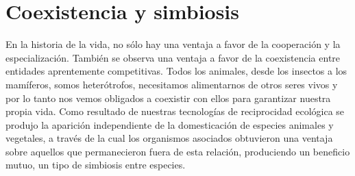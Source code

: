 \documentclass[a4paper,10pt]{book}
\theoremstyle{definition}
\newif\ifen
\newif\ifes
\newcommand{\en}[1]{\ifen#1\fi}
\newcommand{\es}[1]{\ifes#1\fi}
\newcommand{\Ee}{\en{s}\es{e}}
\begin{document}
\es{Cuando el grupo tiene tama\~no 1, la estrategia \'optima es $\Ee^*=p$. }%
\es{Pero apenas surge la cooperaci\'on aparece una ventaja a favor de las estrategias especialistas $\Ee^* > p = 0.71$. }%
%
\es{Cuanto m\'as grande son los grupos, m\'as especialista es vuelve la estrategia \'optima. }%
%
\en{At the extremes (cooperative groups of infinite size) the optimal strategy is reached at the maximum level of specialization, $\Ee=1$. }%
\es{En el extremos (grupos cooperativos de tama\~no inifinito) la estrategia \'optima se alcanza con el nivel de especializaci\'on m\'aximo, $\Ee=1$. }%
%
\es{Aqu\'i mostramos que, una vez que la cooperaci\'on emerge, las estrategias individualmente mal adaptadas al ambiente (especialistas) consigen superar tanto a las estrategias bien adaptas individualmemte (generalistas), como a sus grupos cooperativos de tama\~no infinito. }%

\section{Coexistencia y simbiosis}

En la historia de la vida, no s\'olo hay una ventaja a favor de la cooperaci\'on y la especializaci\'on.
%
Tambi\'en se observa una ventaja a favor de la coexistencia entre entidades aprentemente competitivas.
%
Todos los animales, desde los insectos a los mam\'iferos, somos heter\'otrofos, necesitamos alimentarnos de otros seres vivos y por lo tanto nos vemos obligados a coexistir con ellos para garantizar nuestra propia vida.
Como resultado de nuestras tecnolog\'ias de reciprocidad ecol\'ogica se produjo la aparici\'on independiente de la domesticaci\'on de especies animales y vegetales, a trav\'es de la cual los organismos asociados obtuvieron una ventaja sobre aquellos que permanecieron fuera de esta relaci\'on, produciendo un beneficio mutuo, un tipo de simbiosis entre especies.
% 
\end{document}
